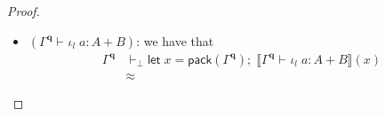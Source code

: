 \documentclass[acmsmall,screen,anonymous,review]{acmart}
\newcommand{\mb}[1]{\ensuremath{\mathbf{#1}}}
\newcommand{\ms}[1]{\ensuremath{\mathsf{#1}}}
\newcommand{\linl}[1]{\iota_l\;{#1}}
\newcommand{\letexpr}[3]{\ensuremath{\ms{let}\;#1 = #2;\;#3}}
\newcommand{\qsp}[4]{#1 \vdash #2 = #3 + #4}
\newcommand{\hasty}[4]{#1 \vdash_{#2} #3: {#4}}
\newcommand{\dnt}[1]{\llbracket{#1}\rrbracket}
\begin{document}
\begin{proof}
\begin{itemize}
\begin{align*}
{        (\dnt{\qsp{\Gamma}{\mb{q}}{\mb{q}_l}{\mb{q}_r}}
        ; \dnt{\Gamma^{\mb{q}_l}} \otimes \dnt{\hasty{\Gamma^{\mb{q}_r}}{\epsilon}{a}{A \otimes B}}
        ; \alpha
        ; \dnt{\hasty{\Gamma^{\mb{q}_l}, x : A, y : B}{\epsilon}{c}{C}}
        )(z)
      } \\
      &\approx
      \letexpr{z}{(\ms{pack}(\Gamma^{\mb{q}_l}), \ms{pack}(\Gamma^{\mb{q}_r}))}{\\ & \qquad ( 
        \dnt{\Gamma^{\mb{q}_l}} \otimes \dnt{\hasty{\Gamma^{\mb{q}_r}}{\epsilon}{a}{A \otimes B}}
        ; \alpha
        ; \dnt{\hasty{\Gamma^{\mb{q}_l}, x : A, y : B}{\epsilon}{c}{C}}
        )(z)
      } \\
      &\approx
      \letexpr{z}{(\ms{pack}(\Gamma^{\mb{q}_l}), 
        \letexpr{w}{\ms{pack}(\Gamma^{\mb{q}_r})}
          {
            \dnt{\hasty{\Gamma^{\mb{q}_r}}{\epsilon}{a}{A \otimes B}(w)}
          }
        )
        }{\\ & \qquad (
        \alpha
        ; \dnt{\hasty{\Gamma^{\mb{q}_l}, x : A, y : B}{\epsilon}{c}{C}}
        )(z)
      } \\
      &\approx
      \letexpr{z}{(\ms{pack}(\Gamma^{\mb{q}_l}), a)
        }{(
        \alpha
        ; \dnt{\hasty{\Gamma^{\mb{q}_l}, x : A, y : B}{\epsilon}{c}{C}}
        )(z)
      }\\
      &\approx
      \letexpr{(z_1, (z_2, z_3))}{(\ms{pack}(\Gamma^{\mb{q}_l}), a)
        }{\letexpr{z}{((z_1, z_2), z_3)}  
          {\dnt{\hasty{\Gamma^{\mb{q}_l}, x : A, y : B}{\epsilon}{c}{C}}(z)}
      } \\
      &\approx
      \letexpr{(z_2, z_3)}{a}{\letexpr{z}{((\ms{pack}(\Gamma^{\mb{q}_l}), z_2), z_3)}  
          {\dnt{\hasty{\Gamma^{\mb{q}_l}, x : A, y : B}{\epsilon}{c}{C}}(z)}
      } \\
      &\approx
      \letexpr{(z_2, z_3)}{a}{\letexpr{z}{\ms{pack}(\Gamma^{\mb{q}_l}, z_2 : A, z_3 : B)}  
          {\dnt{\hasty{\Gamma^{\mb{q}_l}, x : A, y : B}{\epsilon}{c}{C}}(z)}
      }\\
      &\approx
      \letexpr{(z_2, z_3)}{a}{[z_3/y][z_2/x]c}
      \approx
      \letexpr{(x, y)}{a}{c} : C
    \end{align*}
    \item $(\hasty{\Gamma^{\mb{q}}}{}{\linl{a}}{A + B})$: we have that
    \begin{align*}
    \Gamma^{\mb{q}} &\vdash_\bot
      \letexpr{x}{\ms{pack}(\Gamma^{\mb{q}})}{\dnt{\hasty{\Gamma^{\mb{q}}}{}{\linl{a}}{A + B}}(x)}
      \\ &\approx 

\end{align*}
\end{itemize}
\end{proof}
\end{document}
